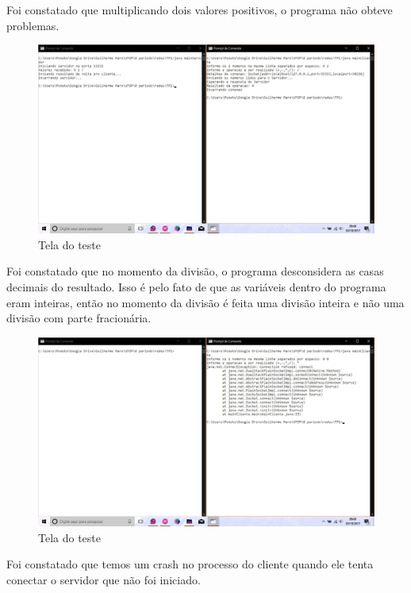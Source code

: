 \documentclass[brazil, a4paper,12pt]{article}
\begin{document}
\begin{itemize}
	Foi constatado que multiplicando dois valores positivos, o programa não obteve problemas.
	
	\newpage	
	
	\begin{figure}[ht!]
		\centering
		\includegraphics[scale=0.45]{teste3.jpg}
		\caption{Tela do teste}
		\label{Rotulo}
	\end{figure}
	
	Foi constatado que no momento da divisão, o programa desconsidera as casas decimais do resultado. Isso é pelo fato de que as variáveis dentro do programa eram inteiras, então no momento da divisão é feita uma divisão inteira e não uma divisão com parte fracionária.
	
	\newpage
	
	\begin{figure}[ht!]
		\centering
		\includegraphics[scale=0.45]{teste4.jpg}
		\caption{Tela do teste}
		\label{Rotulo}
	\end{figure}
	
	Foi constatado que temos um crash no processo do cliente quando ele tenta conectar o servidor que não foi iniciado.
	

\end{itemize}
\end{document}
